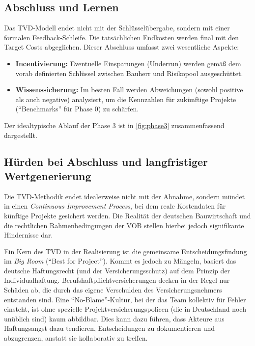 \subsection{Abschluss und Lernen}
\label{sec:4.5.3}
Das \acs{TVD}-Modell endet nicht mit der Schlüsselübergabe, sondern mit einer formalen Feedback-Schleife. Die tatsächlichen Endkosten werden final mit den Target Costs abgeglichen.\autocite[Vgl.][S.~143]{hill_target_2017} Dieser Abschluss umfasst zwei wesentliche Aspekte:
\begin{itemize}
    \item \textbf{Incentivierung:} Eventuelle Einsparungen (Underrun) werden gemäß dem vorab definierten Schlüssel zwischen Bauherr und Risikopool ausgeschüttet.
    \item \textbf{Wissenssicherung:} Im besten Fall werden Abweichungen (sowohl positive als auch negative) analysiert, um die Kennzahlen für zukünftige Projekte (\enquote{Benchmarks} für Phase 0) zu schärfen.
\end{itemize}
Der idealtypische Ablauf der Phase 3 ist in \cref{fig:phase3} zusammenfassend dargestellt.

\FloatBarrier


\subsection{Hürden bei Abschluss und langfristiger Wertgenerierung}
\label{sec:4.5.4}

Die \acs{TVD}-Methodik endet idealerweise nicht mit der Abnahme, sondern mündet in einen \textit{Continuous Improvement Process}, bei dem reale Kostendaten für künftige Projekte gesichert werden. Die Realität der deutschen Bauwirtschaft und die rechtlichen Rahmenbedingungen der \acs{VOB} stellen hierbei jedoch signifikante Hindernisse dar.

Ein Kern des \acs{TVD} in der Realisierung ist die gemeinsame Entscheidungsfindung im \textit{Big Room} (\enquote{Best for Project}). Kommt es jedoch zu Mängeln, basiert das deutsche Haftungsrecht (und der Versicherungsschutz) auf dem Prinzip der Individualhaftung.
Berufshaftpflichtversicherungen decken in der Regel nur Schäden ab, die durch das eigene Verschulden des Versicherungsnehmers entstanden sind. Eine \enquote{No-Blame}-Kultur, bei der das Team kollektiv für Fehler einsteht, ist ohne spezielle Projektversicherungspolicen (die in Deutschland noch unüblich sind) kaum abbildbar. Dies kann dazu führen, dass Akteure aus Haftungsangst dazu tendieren, Entscheidungen zu dokumentieren und abzugrenzen, anstatt sie kollaborativ zu treffen. \autocite[Vgl.][§§~280,~631]{noauthor_burgerliches_1900}


